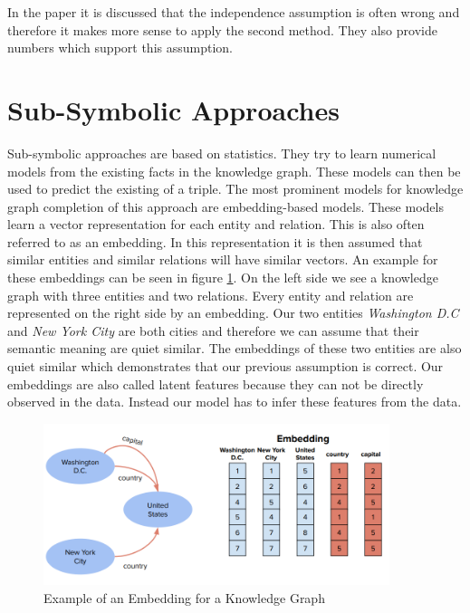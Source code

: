 In the paper it is discussed that the independence assumption is often wrong and therefore it makes more sense to apply the second method. They also provide numbers which support this assumption. 

\section{Sub-Symbolic Approaches}
\label{cha:sub_symbolic_methods}

Sub-symbolic approaches are based on statistics. They try to learn numerical models from the existing facts in the knowledge graph. These models can then be used to predict the existing of a triple.  \cite{nickel_review_2015} The most prominent models for knowledge graph completion of this approach are embedding-based models. These models learn a vector representation for each entity and relation. This is also often referred to as an embedding. In this representation it is then assumed that similar entities and similar relations will have similar vectors. An example for these embeddings can be seen in figure \ref{fig:embedding_example}. On the left side we see a knowledge graph with three entities and two relations. Every entity and relation are represented on the right side by an embedding. Our two entities \textit{Washington D.C} and \textit{New York City} are both cities and therefore we can assume that their semantic meaning are quiet similar. The embeddings of these two entities are also quiet similar which demonstrates that our previous assumption is correct. \cite{bianchi_knowledge_2020} Our embeddings are also called latent features because they can not be directly observed in the data. Instead our model has to infer these features from the data. \cite{nickel_review_2015} 

\begin{figure}[H]
\centering
\includegraphics[width=0.9\textwidth]{images/embedding_example.png}
\caption{Example of an Embedding for a Knowledge Graph}
\label{fig:embedding_example}
\end{figure}

